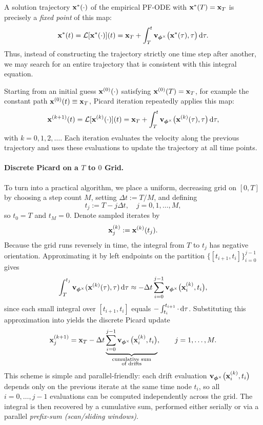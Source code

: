 A solution trajectory ${\mathbf{x}}^*(\cdot)$ of the empirical PF-ODE with
${\mathbf{x}}^*(T)={\mathbf{x}}_T$ is precisely a \emph{fixed point} of this map:
\[
{\mathbf{x}}^*(t)
=
\mathcal{L}[{\mathbf{x}}^*(\cdot)](t)
=
{\mathbf{x}}_T
+
\int_T^t
{\mathbf{v}}_{{\bm{\phi}}^\times}\big({\mathbf{x}}^*(\tau),\tau\big)\mathop{}\!\mathrm{d}\tau.
\]
Thus, instead of constructing the trajectory strictly one time step after
another, we may search for an entire trajectory that is consistent with this
integral equation.

Starting from an initial guess ${\mathbf{x}}^{(0)}(\cdot)$ satisfying
${\mathbf{x}}^{(0)}(T)={\mathbf{x}}_T$, for example the constant path
${\mathbf{x}}^{(0)}(t)\equiv{\mathbf{x}}_T$, Picard iteration repeatedly applies this map:
\begin{align}\label{eq:picard_iter_T_to_t}
{\mathbf{x}}^{(k+1)}(t)
=
\mathcal{L}[{\mathbf{x}}^{(k)}(\cdot)](t)
=
{\mathbf{x}}_T
+
\int_T^t
{\mathbf{v}}_{{\bm{\phi}}^\times}
\big({\mathbf{x}}^{(k)}(\tau),\tau\big)\mathop{}\!\mathrm{d}\tau,
\end{align}
with $k=0,1,2,\ldots$. Each iteration evaluates the velocity along the previous trajectory and uses
these evaluations to update the trajectory at all time points.

\paragraph{Discrete Picard on a $T$ to $0$ Grid.}
To turn  into a practical algorithm, we place a
uniform, decreasing grid on $[0,T]$ by choosing a step count $M$, setting
$\Delta t := T/M$, and defining
\[
t_j := T - j \Delta t,
\quad j=0,1,\ldots,M,
\]
so $t_0=T$ and $t_M=0$. Denote sampled iterates by
\[
{\mathbf{x}}^{(k)}_j := {\mathbf{x}}^{(k)}(t_j).
\]
Because the grid runs reversely in time, the
integral from $T$ to $t_j$ has negative orientation. Approximating it by
left endpoints on the partition $\{[t_{i+1},t_i]\}_{i=0}^{j-1}$ gives
\[
\int_{T}^{t_j}{\mathbf{v}}_{{\bm{\phi}}^\times}({\mathbf{x}}^{(k)}(\tau), \tau) \mathop{}\!\mathrm{d}\tau
 \approx 
- \Delta t \sum_{i=0}^{j-1} {\mathbf{v}}_{{\bm{\phi}}^\times}\big({\mathbf{x}}^{(k)}_{i}, t_i\big),
\]
since each small integral over $[t_{i+1},t_i]$ equals
$- \int_{t_i}^{t_{i+1}} \cdot\mathop{}\!\mathrm{d}\tau$. Substituting this approximation
into  yields the discrete Picard update
\begin{equation}\label{eq:discrete_picard_decreasing}
{\mathbf{x}}^{(k+1)}_j
=
{\mathbf{x}}_T
-
\Delta t
\underbrace{
\sum_{i=0}^{j-1}
{\mathbf{v}}_{{\bm{\phi}}^\times}
\big({\mathbf{x}}^{(k)}_i,t_i\big)
}_{\substack{\text{cumulative sum}\\\text{of drifts}}},
\qquad
j=1,\ldots,M.
\end{equation}
This scheme is simple and parallel-friendly: each drift evaluation
${\mathbf{v}}_{{\bm{\phi}}^\times} \big({\mathbf{x}}^{(k)}_i,t_i\big)$ depends only on the previous
iterate at the same time node $t_i$, so all $i=0,\dots,j - 1$
evaluations can be computed independently across the grid. The integral is then
recovered by a cumulative sum, performed either serially or via a parallel
\emph{prefix-sum (scan/sliding windows)}.


